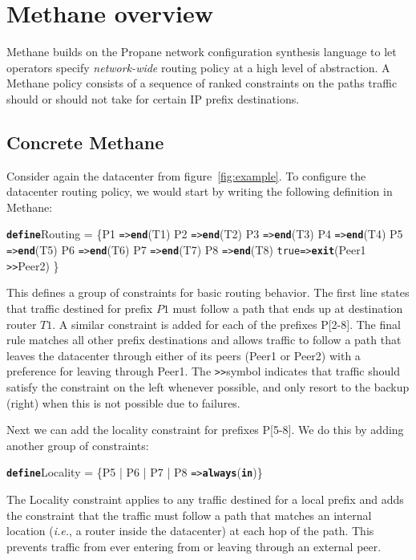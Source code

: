 \documentclass{sig-alternate-10pt}
\newcommand{\IE}{\emph{i.e.}}
\newcommand{\sysname}{{\small \sf Methane}\xspace}
\newcommand{\CD}[1]{\texttt{\small #1}}  %
\newcommand{\KW}[1]{\texttt{\small\bfseries{#1}}}
\newcommand{\True}{\CD{true}}
\newcommand{\Define}{\KW{define}}
\newcommand{\Prefer}{\texttt{>>}}
\newcommand{\Path}{\texttt{=>}}
\newcommand{\In}{\KW{in}}
\newcommand{\Exit}{\KW{exit}}
\newcommand{\End}{\KW{end}}
\newcommand{\Always}{\KW{always}}
\begin{document}
\section{Methane overview}
\label{sec:propane}

\sysname builds on the Propane network configuration synthesis language to let
operators specify \emph{network-wide} routing policy at a high level of abstraction.
A \sysname policy consists of a sequence of ranked constraints on the paths traffic should 
or should not take for certain IP prefix destinations.

\subsection{Concrete Methane}

Consider again the datacenter from figure~\ref{fig:example}. To configure the datacenter routing
policy, we would start by writing the following definition in \sysname:
%
\begin{code}
\Define Routing =
    \{P1 \Path \End(T1)
     P2 \Path \End(T2)
     P3 \Path \End(T3)
     P4 \Path \End(T4)
     P5 \Path \End(T5)
     P6 \Path \End(T6)
     P7 \Path \End(T7)
     P8 \Path \End(T8)
     \True \Path \Exit(Peer1 \Prefer Peer2) \}
\end{code}
\noindent%

This defines a group of constraints for basic routing behavior. The first line states 
that traffic destined for prefix $P1$ must follow a path that ends up at destination router $T1$.
A similar constraint is added for each of the prefixes P[2-8]. The final rule matches all other
prefix destinations and allows traffic to follow a path that leaves the datacenter through either
of its peers (Peer1 or Peer2) with a preference for leaving through Peer1. The \Prefer symbol indicates
that traffic should satisfy the constraint on the left whenever possible, and only resort to the backup (right)
when this is not possible due to failures.

Next we can add the locality constraint for prefixes P[5-8]. We do this by adding another group of constraints:
%
\begin{code}
\Define Locality =
    \{P5 | P6 | P7 | P8 \Path \Always(\In)\}
\end{code}
\noindent%

The Locality constraint applies to any traffic destined for a local prefix and adds
the constraint that the traffic must follow a path that matches an internal location 
(\IE, a router inside the datacenter) at each hop of the path. This prevents traffic 
from ever entering from or leaving through an external peer.
\end{document}
